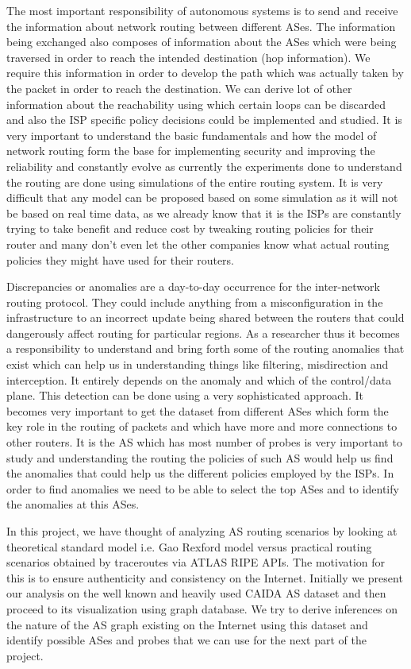 \documentclass{sig-alternate-05-2015}
\begin{document}
The most important responsibility of autonomous systems is to send and receive the information about network routing between different ASes. The information being exchanged also composes of information about the ASes which were being traversed in order to reach the intended destination (hop information). We require this information in order to develop the path which was actually taken by the packet in order to reach the destination. We can derive lot of other information about the reachability using which certain loops can be discarded and also the ISP specific policy decisions could be implemented and studied. It is very important to understand the basic fundamentals and how the model of network routing form the base for implementing security and improving the reliability and constantly evolve as currently the experiments done to understand the routing are done using simulations of the entire routing system. It is very difficult that any model can be proposed based on some simulation as it will not be based on real time data, as we already know that it is the ISPs are constantly trying to take benefit and reduce cost by tweaking routing policies for their router and many don’t even let the other companies know what actual routing policies they might have used for their routers. 

Discrepancies or anomalies are a day-to-day occurrence for the inter-network routing protocol. They could include anything from a misconfiguration in the infrastructure to an incorrect update being shared between the routers that could dangerously affect routing for particular regions. As a researcher thus it becomes a responsibility to understand and bring forth some of the routing anomalies that exist which can help us in understanding things like filtering, misdirection and interception. It entirely depends on the anomaly and which of the control/data plane. This detection can be done using a very sophisticated approach. It becomes very important to get the dataset from different ASes which form the key role in the routing of packets and which have more and more connections to other routers. It is the AS which has most number of probes is very important to study and understanding the routing the policies of such AS would help us find the anomalies that could help us the different policies employed by the ISPs. In order to find anomalies we need to be able to select the top ASes and to identify the anomalies at this ASes.

In this project, we have thought of analyzing AS routing scenarios by looking at theoretical standard model i.e. Gao Rexford model versus practical routing scenarios obtained by traceroutes via ATLAS RIPE APIs. The motivation for this is to ensure authenticity and consistency on the Internet. Initially we present our analysis on the well known and heavily used CAIDA AS dataset and then proceed to its visualization using graph database. We try to derive inferences on the nature of the AS graph existing on the Internet using this dataset and identify possible ASes and probes that we can use for the next part of the project.
\end{document}

